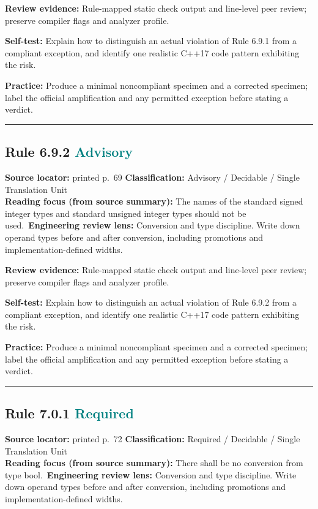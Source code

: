 \documentclass[10pt,letterpaper]{article}
\begin{document}
\textbf{Review evidence:} Rule-mapped static check output and line-level peer review; preserve compiler flags and analyzer profile.

\textbf{Self-test:} Explain how to distinguish an actual violation of Rule 6.9.1 from a compliant exception, and identify one realistic C++17 code pattern exhibiting the risk.\par
\textbf{Practice:} Produce a minimal noncompliant specimen and a corrected specimen; label the official amplification and any permitted exception before stating a verdict.
\smallskip\hrule\smallskip
\subsection*{Rule 6.9.2 \enspace \texorpdfstring{\small\textcolor{teal}{Advisory}}{Advisory}}
\noindent\textbf{Source locator:} printed p.~69 \quad\textbf{Classification:} Advisory / Decidable / Single Translation Unit\\
\textbf{Reading focus (from source summary):} The names of the standard signed integer types and standard unsigned integer types should not be used.\
\textbf{Engineering review lens:} Conversion and type discipline. Write down operand types before and after conversion, including promotions and implementation-defined widths.

\textbf{Review evidence:} Rule-mapped static check output and line-level peer review; preserve compiler flags and analyzer profile.

\textbf{Self-test:} Explain how to distinguish an actual violation of Rule 6.9.2 from a compliant exception, and identify one realistic C++17 code pattern exhibiting the risk.\par
\textbf{Practice:} Produce a minimal noncompliant specimen and a corrected specimen; label the official amplification and any permitted exception before stating a verdict.
\smallskip\hrule\smallskip
\subsection*{Rule 7.0.1 \enspace \texorpdfstring{\small\textcolor{teal}{Required}}{Required}}
\noindent\textbf{Source locator:} printed p.~72 \quad\textbf{Classification:} Required / Decidable / Single Translation Unit\\
\textbf{Reading focus (from source summary):} There shall be no conversion from type bool.\
\textbf{Engineering review lens:} Conversion and type discipline. Write down operand types before and after conversion, including promotions and implementation-defined widths.
\end{document}
